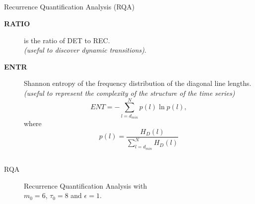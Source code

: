 \subsection{}
{

\begin{frame}{Recurrence Quantification Analysis (RQA)}

\begin{description}
\item [ \textbf{RATIO} ] is the ratio of DET to REC. \\
			\textit{(useful to discover dynamic transitions)}.
\item [ \textbf{ENTR} ] Shannon entropy of the frequency distribution of the 
			diagonal line lengths.
			\textit{(useful to represent the complexity of the 
				structure of the time series)}
\begin{equation*}
	ENT= - \sum^{N}_{l=d_{min}} p(l) \ln p(l),
\end{equation*}
where 
\begin{equation*}
	p(l)=\frac{ H_D(l) }{ \sum^{N}_{ l=d_{min} } H_D(l) }
\end{equation*}

\end{description}


	
\end{frame}
}




\subsection{}
{

\begin{frame}{RQA}

    \begin{figure}
	\caption{Recurrence Quantification Analysis with \\
		$m_0=6$, $\tau_0=8$ and $\epsilon=1$.
		} 
   \end{figure}
		
\end{frame}
}







